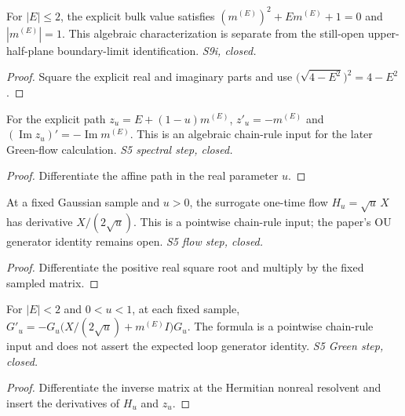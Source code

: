 \begin{lemma}
  \label{lem:spectral-algebra}
  \leanok
  For $|E|\le2$, the explicit bulk value satisfies
  $(m^{(E)})^2+E m^{(E)}+1=0$ and $|m^{(E)}|=1$.
  This algebraic characterization is separate from the still-open
  upper-half-plane boundary-limit identification. \emph{S9i, closed.}
\end{lemma}
\begin{proof}\leanok
  Square the explicit real and imaginary parts and use
  $\bigl(\sqrt{4-E^2}\bigr)^2=4-E^2$.
\end{proof}

\begin{lemma}
  \label{lem:spectral-derivative}
  \leanok
  For the explicit path $z_u=E+(1-u)m^{(E)}$,
  $z'_u=-m^{(E)}$ and
  $(\operatorname{Im}z_u)'=-\operatorname{Im}m^{(E)}$.
  This is an algebraic chain-rule input for the later Green-flow calculation.
  \emph{S5 spectral step, closed.}
\end{lemma}
\begin{proof}\leanok
  Differentiate the affine path in the real parameter $u$.
\end{proof}

\begin{lemma}
  \label{lem:flow-derivative}
  \leanok
  At a fixed Gaussian sample and $u>0$, the surrogate one-time flow
  $H_u=\sqrt u\,X$ has derivative $X/(2\sqrt u)$.
  This is a pointwise chain-rule input; the paper's OU generator identity
  remains open. \emph{S5 flow step, closed.}
\end{lemma}
\begin{proof}\leanok
  Differentiate the positive real square root and multiply by the fixed
  sampled matrix.
\end{proof}

\begin{lemma}
  \label{lem:green-derivative}
  \leanok
  For $|E|<2$ and $0<u<1$, at each fixed sample,
  $G'_u=-G_u\bigl(X/(2\sqrt u)+m^{(E)}I\bigr)G_u$.
  The formula is a pointwise chain-rule input and does not assert the
  expected loop generator identity. \emph{S5 Green step, closed.}
\end{lemma}
\begin{proof}\leanok
  Differentiate the inverse matrix at the Hermitian nonreal resolvent and
  insert the derivatives of $H_u$ and $z_u$.
\end{proof}

